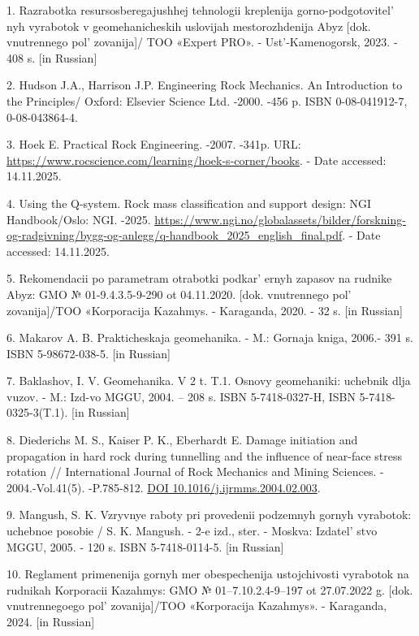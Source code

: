 \begin{refs}
1. Razrabotka resursosberegajushhej tehnologii kreplenija
gorno-podgotovitel' nyh vyrabotok v geomehanicheskih
uslovijah mestorozhdenija Abyz {[}dok. vnutrennego
pol' zovanija{]}/ TOO «Expert PRO». -
Ust'-Kamenogorsk, 2023. - 408 s. {[}in Russian{]}

2. Hudson J.A., Harrison J.P. Engineering Rock Mechanics. An
Introduction to the Principles/ Oxford: Elsevier Science Ltd. -2000.
-456 p. ISBN 0-08-041912-7, 0-08-043864-4.

3. Hoek E. Practical Rock Engineering. -2007. -341p. URL:
\url{https://www.rocscience.com/learning/hoek-s-corner/books}. - Date
accessed: 14.11.2025.

4. Using the Q-system. Rock mass classification and support design: NGI
Handbook/Oslo: NGI. -2025.
\url{https://www.ngi.no/globalassets/bilder/forskning-og-radgivning/bygg-og-anlegg/q-handbook_2025_english_final.pdf}.
- Date accessed: 14.11.2025.

5. Rekomendacii po parametram otrabotki podkar' ernyh
zapasov na rudnike Abyz: GMO № 01-9.4.3.5-9-290 ot 04.11.2020. {[}dok.
vnutrennego pol' zovanija{]}/TOO «Korporacija Kazahmys. -
Karaganda, 2020. - 32 s. {[}in Russian{]}

6. Makarov A. B. Prakticheskaja geomehanika. - M.: Gornaja kniga, 2006.-
391 s. ISBN 5-98672-038-5. {[}in Russian{]}

7. Baklashov, I. V. Geomehanika. V 2 t. T.1. Osnovy geomehaniki:
uchebnik dlja vuzov. - M.: Izd-vo MGGU, 2004. -- 208 s. ISBN
5-7418-0327-H, ISBN 5-7418-0325-3(T.1). {[}in Russian{]}

8. Diederichs M. S., Kaiser P. K., Eberhardt E. Damage initiation and
propagation in hard rock during tunnelling and the influence of
near-face stress rotation // International Journal of Rock Mechanics and
Mining Sciences. - 2004.-Vol.41(5). -P.785-812.
\href{https://doi.org/10.1016/j.ijrmms.2004.02.003}{DOI
10.1016/j.ijrmms.2004.02.003}.

9. Mangush, S. K. Vzryvnye raboty pri provedenii podzemnyh gornyh
vyrabotok: uchebnoe posobie / S. K. Mangush. - 2-e izd., ster. - Moskva:
Izdatel' stvo MGGU, 2005. - 120 s. ISBN 5-7418-0114-5.
{[}in Russian{]}

10. Reglament primenenija gornyh mer obespechenija ustojchivosti
vyrabotok na rudnikah Korporacii Kazahmys: GMO № 01--7.10.2.4-9--197 ot
27.07.2022 g. {[}dok. vnutrennegoego pol' zovanija{]}/TOO
«Korporacija Kazahmys». - Karaganda, 2024. {[}in Russian{]}
\end{refs}

